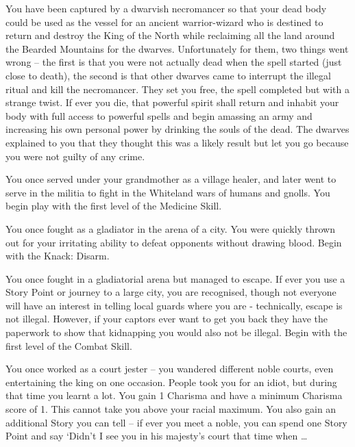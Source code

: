 \begin{multicols}{2}
\begin{list}{\addtocounter{list}{1}\textbf{:}}{\raggedleft}
\item{ You have been captured by a dwarvish necromancer so that your dead body could be used as the vessel for an ancient warrior-wizard who is destined to return and destroy the King of the North while reclaiming all the land around the Bearded Mountains for the dwarves.  Unfortunately for them, two things went wrong -- the first is that you were not actually dead when the spell started (just close to death), the second is that other dwarves came to interrupt the illegal ritual and kill the necromancer.  They set you free, the spell completed but with a strange twist.  If ever you die, that powerful spirit shall return and inhabit your body with full access to powerful spells and begin amassing an army and increasing his own personal power by drinking the souls of the dead.  The dwarves explained to you that they thought this was a likely result but let you go because you were not guilty of any crime. }

\item{ You once served under your grandmother as a village healer, and later went to serve in the militia to fight in the Whiteland wars of humans and gnolls.  You begin play with the first level of the Medicine Skill. }

\item{ You once fought as a gladiator in the arena of a city.  You were quickly thrown out for your irritating ability to defeat opponents without drawing blood.  Begin with the Knack: Disarm. }

\item{ You once fought in a gladiatorial arena but managed to escape.  If ever you use a Story Point or journey to a large city, you are recognised, though not everyone will have an interest in telling local guards where you are - technically, escape is not illegal.  However, if your captors ever want to get you back they have the paperwork to show that kidnapping you would also not be illegal.  Begin with the first level of the Combat Skill. }

\item{ You once worked as a court jester -- you wandered different noble courts, even entertaining the king on one occasion.  People took you for an idiot, but during that time you learnt a lot.  You gain 1 Charisma and have a minimum Charisma score of 1.  This cannot take you above your racial maximum.  You also gain an additional Story you can tell -- if ever you meet a noble, you can spend one Story Point and say `Didn't I see you in his majesty's court that time when \ldots}


\end{list}
\end{multicols}
